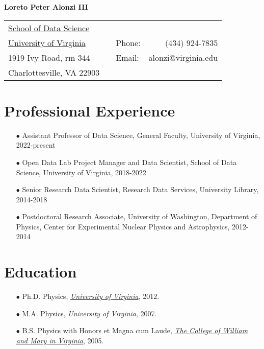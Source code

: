 \documentclass{article}[10pt]
\begin{document}
\begin{center}
{\LARGE \textbf{Loreto Peter Alonzi III} }

\vspace{0.5cm}

\begin{tabular}{lclr}
\hline
\hline
\href{https://datascience.virginia.edu/}{School of Data Science}         & \qquad \qquad &  &         \\
\href{virginia.edu}{University of Virginia}        & \qquad \qquad &Phone: &   (434) 924-7835      \\
1919 Ivy Road, rm 344              & \qquad \qquad & Email: & alonzi@virginia.edu \\
Charlottesville, VA 22903& \qquad \qquad &        &                     \\
\hline
\hline
\end{tabular}
\end{center}

\section*{Professional Experience}
\begin{itemize}
\item [$\bullet$] Assistant Professor of Data Science, General Faculty, University of Virginia, 2022-present
\item [$\bullet$] Open Data Lab Project Manager and Data Scientist, School of Data Science, University of Virginia, 2018-2022
\item [$\bullet$] Senior Research Data Scientist, Research Data Services, University Library, 2014-2018
\item [$\bullet$] Postdoctoral Research Associate, University of Washington, Department of Physics, Center for Experimental Nuclear Physics and Astrophysics, 2012-2014
\end{itemize}


\section*{Education}
\begin{itemize}
\item [$\bullet$] Ph.D. Physics, \href{http://www.phys.virginia.edu/}{\emph{University of Virginia}}, 2012.
\item [$\bullet$] M.A. Physics, \emph{University of Virginia}, 2007.
\item [$\bullet$] B.S. Physics with Honors et Magna cum Laude, \href{http://www.wm.edu/}{\emph{The College of William and Mary in Virginia}}, 2005.
\end{itemize}
\end{document}
